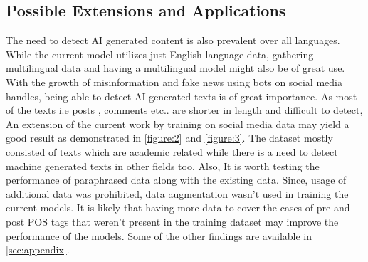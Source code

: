 \documentclass[11pt]{article}
\begin{document}
\subsection{Possible Extensions and Applications}
The need to detect AI generated content is also prevalent over all languages. While the current model utilizes just English language data, gathering multilingual data and having a multilingual model might also be of great use. With the growth of misinformation and fake news using bots on social media handles\cite{NEURIPS2019_3e9f0fc9}, being able to detect AI generated texts is of great importance. As most of the texts i.e posts , comments etc.. are shorter in length and difficult to detect, An extension of the current work by training on social media data may yield a good result as demonstrated in \autoref{figure:2} and \autoref{figure:3}. The dataset mostly consisted of texts which are academic related while there is a need to detect machine generated texts in other fields too. Also, It is worth testing the performance of paraphrased data along with the existing data. Since, usage of additional data was prohibited, data augmentation wasn't used in training the current models. It is likely that having more data to cover the cases of pre and post POS tags that weren't present in the training dataset may improve the performance of the models. Some of the other findings are available in \autoref{sec:appendix}.
\end{document}
